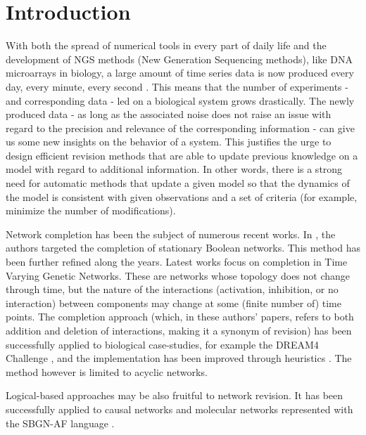 \section{Introduction} 

With both the spread of numerical tools in every part of daily life and the development of NGS methods (New Generation Sequencing methods), like DNA microarrays in biology, a large amount of time series data is now produced every day, every minute, every second \cite{marx2013biology}. This means that the number of experiments - and corresponding data - led on a biological system grows drastically. The newly produced data - as long as the associated noise does not raise an issue with regard to the precision and relevance of the corresponding information - can give us some new insights on the behavior of a system. This justifies the urge to design efficient revision methods that are able to update previous knowledge on a model with regard to additional information. In other words, there is a strong need for automatic methods that update a given model so that the dynamics of the model is consistent with given observations and a set of criteria (for example, minimize the number of modifications). 

Network completion has been the subject of numerous recent works. In \cite{akutsu2009completing}, the authors targeted the completion of stationary Boolean networks. This method has been further refined along the years. Latest works \cite{nakajima2013network} focus on completion in Time Varying Genetic Networks. These are networks whose topology does not change through time, but the nature of the interactions (activation, inhibition, or no interaction) between components may change at some (finite number of) time points. The completion approach (which, in these authors' papers, refers to both addition and deletion of interactions, making it a synonym of revision) has been successfully applied to biological case-studies, for example the DREAM4 Challenge \cite{nakajima2014network}, and the implementation has been improved through heuristics \cite{nakajima2014exact}. The method however is limited to acyclic networks. 

Logical-based approaches may be also fruitful to network revision. It has been successfully applied to causal networks \cite{inoue2013completing} and molecular networks represented with the SBGN-AF language \cite{yamamoto2014completing}. 

